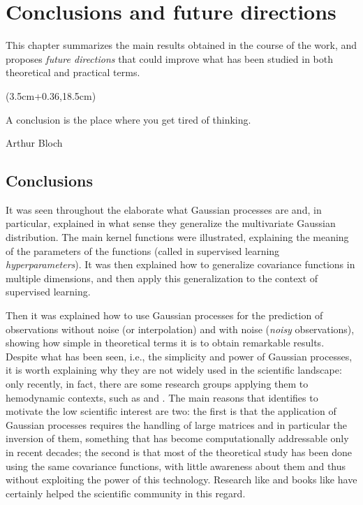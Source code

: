 \chapter{Conclusions and future directions}
This chapter summarizes the main results obtained in the course of the work, and proposes \textit{future directions} that could improve what has been studied in both theoretical and practical terms.

\begin{textblock*}{0.64\textwidth}(3.5cm+0.36\textwidth,18.5cm)
\epigraph{A conclusion is the place where you get tired of thinking.}{Arthur Bloch}
\end{textblock*}

\newpage



\section{Conclusions}
It was seen throughout the elaborate what Gaussian processes are and, in particular, explained in what sense they generalize the multivariate Gaussian distribution. The main kernel functions were illustrated, explaining the meaning of the parameters of the functions (called in supervised learning \textit{hyperparameters}). It was then explained how to generalize covariance functions in multiple dimensions, and then apply this generalization to the context of supervised learning.

Then it was explained how to use Gaussian processes for the prediction of observations without noise (or interpolation) and with noise (\textit{noisy} observations), showing how simple in theoretical terms it is to obtain remarkable results.\\

Despite what has been seen, i.e., the simplicity and power of Gaussian processes, it is worth explaining why they are not widely used in the scientific landscape: only recently, in fact, there are some research groups applying them to hemodynamic contexts, such as \cite{doi:10.1098/rsta.2019.0334} and \cite{Yuhn2022.03.10.483573}. The main reasons that \cite{rasmussen_gaussian_2006} identifies to motivate the low scientific interest are two: the first is that the application of Gaussian processes requires the handling of large matrices and in particular the inversion of them, something that has become computationally addressable only in recent decades; the second is that most of the theoretical study has been done using the same covariance functions, with little awareness about them and thus without exploiting the power of this technology. Research like \cite{duvenaud_automatic_2014} and books like \cite{rasmussen_gaussian_2006} have certainly helped the scientific community in this regard. \\

